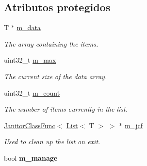 \subsection*{\-Atributos protegidos}
\begin{DoxyCompactItemize}
\item 
\hypertarget{classxsens_1_1List_a14d4ca60bb2c6df6335c2db4267c4fd4}{\-T $\ast$ \hyperlink{classxsens_1_1List_a14d4ca60bb2c6df6335c2db4267c4fd4}{m\-\_\-data}}\label{classxsens_1_1List_a14d4ca60bb2c6df6335c2db4267c4fd4}

\begin{DoxyCompactList}\small\item\em \-The array containing the items. \end{DoxyCompactList}\item 
\hypertarget{classxsens_1_1List_a6a5cdc3079d8b7fe98bf4c3093620a34}{uint32\-\_\-t \hyperlink{classxsens_1_1List_a6a5cdc3079d8b7fe98bf4c3093620a34}{m\-\_\-max}}\label{classxsens_1_1List_a6a5cdc3079d8b7fe98bf4c3093620a34}

\begin{DoxyCompactList}\small\item\em \-The current size of the data array. \end{DoxyCompactList}\item 
\hypertarget{classxsens_1_1List_a0c934fc3c20fd74998852a35f6f0fdd2}{uint32\-\_\-t \hyperlink{classxsens_1_1List_a0c934fc3c20fd74998852a35f6f0fdd2}{m\-\_\-count}}\label{classxsens_1_1List_a0c934fc3c20fd74998852a35f6f0fdd2}

\begin{DoxyCompactList}\small\item\em \-The number of items currently in the list. \end{DoxyCompactList}\item 
\hypertarget{classxsens_1_1List_a79adc45a1ab92b600c8adfcb4c91dacb}{\hyperlink{classxsens_1_1JanitorClassFunc}{\-Janitor\-Class\-Func}$<$ \hyperlink{classxsens_1_1List}{\-List}$<$ \-T $>$ $>$ $\ast$ \hyperlink{classxsens_1_1List_a79adc45a1ab92b600c8adfcb4c91dacb}{m\-\_\-jcf}}\label{classxsens_1_1List_a79adc45a1ab92b600c8adfcb4c91dacb}

\begin{DoxyCompactList}\small\item\em \-Used to clean up the list on exit. \end{DoxyCompactList}\item 
\hypertarget{classxsens_1_1List_a9f0c05adf56803ac80b4e8658a5e5d6e}{bool {\bfseries m\-\_\-manage}}\label{classxsens_1_1List_a9f0c05adf56803ac80b4e8658a5e5d6e}

\end{DoxyCompactItemize}


